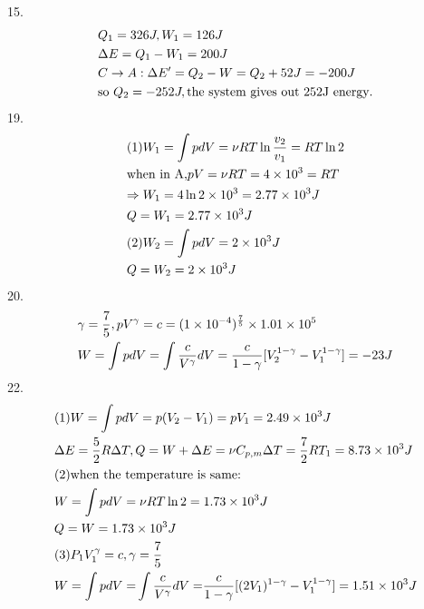 \documentclass{article}
\begin{document}
15.\[\begin{gathered}
{Q_1} = 326J,{W_1} = 126J \hfill \\
\Delta E = {Q_1} - {W_1} = 200J \hfill \\
C \to A:\Delta E' = {Q_2} - W = {Q_2} + 52J =  - 200J \hfill \\
{\text{so }}{Q_2} =  - 252J,{\text{the system gives out 252J energy}}{\text{.}} \hfill \\ 
\end{gathered} \]
19.\[\begin{gathered}
(1){W_1} = \int {pdV = \nu RT\ln \frac{{{v_2}}}{{{v_1}}} = RT\ln 2}  \hfill \\
{\text{when in A,}}pV = \nu RT = 4 \times {10^3} = RT \hfill \\
\Rightarrow {W_1} = 4\ln 2 \times {10^3} = 2.77 \times {10^3}J \hfill \\
Q = {W_1} = 2.77 \times {10^3}J \hfill \\
(2){W_2} = \int {pdV = 2 \times {{10}^3}J}  \hfill \\
Q = {W_2} = 2 \times {10^3}J \hfill \\ 
\end{gathered} \]
20.\[\begin{gathered}
\gamma  = \frac{7}{5},p{V^\gamma } = c = {(1 \times {10^{ - 4}})^{\frac{7}{5}}} \times 1.01 \times {10^5} \hfill \\
W = \int {pdV = \int {\frac{c}{{{V^\gamma }}}dV = \frac{c}{{1 - \gamma }}[V_2^{1 - \gamma } - V_1^{1 - \gamma }] =  - 23J} }  \hfill \\ 
\end{gathered} \]
22.\[\begin{gathered}
(1)W = \int {pdV = p({V_2} - {V_1}) = p{V_1} = 2.49 \times {{10}^3}J}  \hfill \\
\Delta E = \frac{5}{2}R\Delta T,Q = W + \Delta E = \nu {C_{p,m}}\Delta T = \frac{7}{2}R{T_1} = 8.73 \times {10^3}J \hfill \\
(2){\text{when the temperature is same:}} \hfill \\
W = \int {pdV = \nu RT\ln 2}  = 1.73 \times {10^3}J \hfill \\
Q = W = 1.73 \times {10^3}J \hfill \\ 
(3){P_1}V_1^\gamma  = c,\gamma  = \frac{7}{5} \hfill \\
W = \int {pdV = } \int {\frac{c}{{{V^\gamma }}}dV = } \frac{c}{{1 - \gamma }}[{(2{V_1})^{1 - \gamma }} - V_1^{1 - \gamma }] = 1.51 \times {10^3}J \hfill \\ 
\end{gathered} \]
\end{document}
